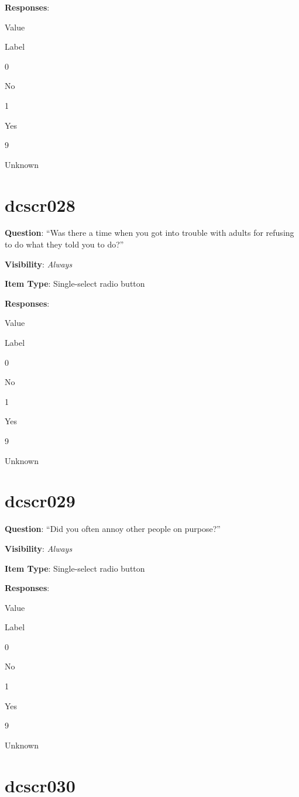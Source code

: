 \documentclass[]{book}
\begin{document}
\textbf{Responses}:

Value

Label

0

No

1

Yes

9

Unknown

\hypertarget{dcscr028}{%
\section{dcscr028}\label{dcscr028}}

\textbf{Question}: ``Was there a time when you got into trouble with adults for refusing to do what they told you to do?''

\textbf{Visibility}: \emph{Always}

\textbf{Item Type}: Single-select radio button

\textbf{Responses}:

Value

Label

0

No

1

Yes

9

Unknown

\hypertarget{dcscr029}{%
\section{dcscr029}\label{dcscr029}}

\textbf{Question}: ``Did you often annoy other people on purpose?''

\textbf{Visibility}: \emph{Always}

\textbf{Item Type}: Single-select radio button

\textbf{Responses}:

Value

Label

0

No

1

Yes

9

Unknown

\hypertarget{dcscr030}{%
\section{dcscr030}\label{dcscr030}}
\end{document}
